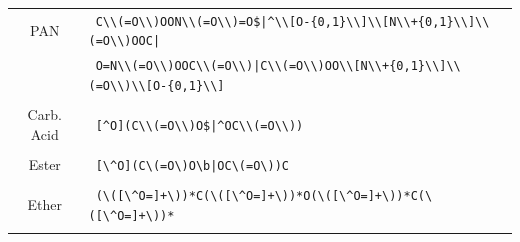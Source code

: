 %



\begin{table}[H]
    \centering
    \begin{tabular}{c|p{5in}}


PAN & \verb! C\\(=O\\)OON\\(=O\\)=O$|^\\[O-{0,1}\\]\\[N\\+{0,1}\\]\\(=O\\)OOC|!\\&\verb! O=N\\(=O\\)OOC\\(=O\\)|C\\(=O\\)OO\\[N\\+{0,1}\\]\\(=O\\)\\[O-{0,1}\\]!\\&\\

Carb. Acid & \verb! [^O](C\\(=O\\)O$|^OC\\(=O\\))!\\&\\

Ester & \verb! [\^O](C\(=O\)O\b|OC\(=O\))C!\\&\\

Ether & \verb! (\([\^O=]+\))*C(\([\^O=]+\))*O(\([\^O=]+\))*C(\([\^O=]+\))*!\\&\\


\end{tabular}
\end{table}
